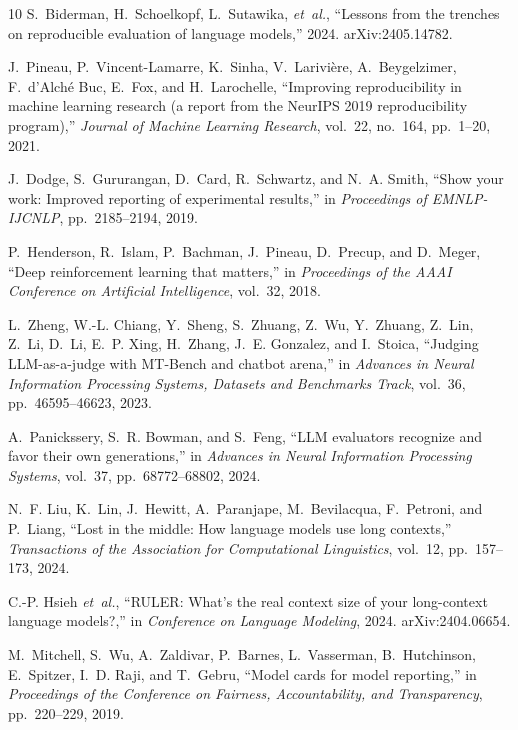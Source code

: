 \documentclass[11pt]{article}
\begin{document}
\begin{thebibliography}{10}
S.~Biderman, H.~Schoelkopf, L.~Sutawika, {\em et~al.}, ``Lessons from the
  trenches on reproducible evaluation of language models,'' 2024.
\newblock arXiv:2405.14782.

J.~Pineau, P.~Vincent-Lamarre, K.~Sinha, V.~Larivi{\`e}re, A.~Beygelzimer,
  F.~d'Alch{\'e} Buc, E.~Fox, and H.~Larochelle, ``Improving reproducibility in
  machine learning research (a report from the {NeurIPS} 2019 reproducibility
  program),'' {\em Journal of Machine Learning Research}, vol.~22, no.~164,
  pp.~1--20, 2021.

J.~Dodge, S.~Gururangan, D.~Card, R.~Schwartz, and N.~A. Smith, ``Show your
  work: Improved reporting of experimental results,'' in {\em Proceedings of
  EMNLP-IJCNLP}, pp.~2185--2194, 2019.

P.~Henderson, R.~Islam, P.~Bachman, J.~Pineau, D.~Precup, and D.~Meger, ``Deep
  reinforcement learning that matters,'' in {\em Proceedings of the AAAI
  Conference on Artificial Intelligence}, vol.~32, 2018.

L.~Zheng, W.-L. Chiang, Y.~Sheng, S.~Zhuang, Z.~Wu, Y.~Zhuang, Z.~Lin, Z.~Li,
  D.~Li, E.~P. Xing, H.~Zhang, J.~E. Gonzalez, and I.~Stoica, ``Judging
  {LLM}-as-a-judge with {MT-Bench} and chatbot arena,'' in {\em Advances in
  Neural Information Processing Systems, Datasets and Benchmarks Track},
  vol.~36, pp.~46595--46623, 2023.

A.~Panickssery, S.~R. Bowman, and S.~Feng, ``{LLM} evaluators recognize and
  favor their own generations,'' in {\em Advances in Neural Information
  Processing Systems}, vol.~37, pp.~68772--68802, 2024.

N.~F. Liu, K.~Lin, J.~Hewitt, A.~Paranjape, M.~Bevilacqua, F.~Petroni, and
  P.~Liang, ``Lost in the middle: How language models use long contexts,'' {\em
  Transactions of the Association for Computational Linguistics}, vol.~12,
  pp.~157--173, 2024.

C.-P. Hsieh {\em et~al.}, ``{RULER}: What's the real context size of your
  long-context language models?,'' in {\em Conference on Language Modeling},
  2024.
\newblock arXiv:2404.06654.

M.~Mitchell, S.~Wu, A.~Zaldivar, P.~Barnes, L.~Vasserman, B.~Hutchinson,
  E.~Spitzer, I.~D. Raji, and T.~Gebru, ``Model cards for model reporting,'' in
  {\em Proceedings of the Conference on Fairness, Accountability, and
  Transparency}, pp.~220--229, 2019.


\end{thebibliography}
\end{document}
